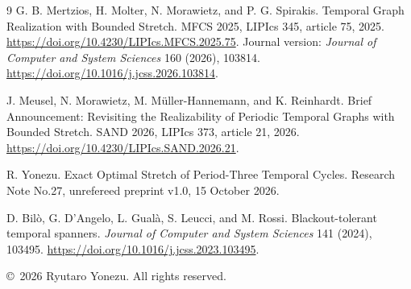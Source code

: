 \documentclass[11pt,a4paper]{article}
\begin{document}
\begin{thebibliography}{9}
G. B. Mertzios, H. Molter, N. Morawietz, and P. G. Spirakis.
\newblock Temporal Graph Realization with Bounded Stretch.
\newblock MFCS 2025, LIPIcs 345, article 75, 2025.
\newblock \url{https://doi.org/10.4230/LIPIcs.MFCS.2025.75}.
\newblock Journal version: \emph{Journal of Computer and System Sciences} 160 (2026), 103814.
\url{https://doi.org/10.1016/j.jcss.2026.103814}.

J. Meusel, N. Morawietz, M. M\"uller-Hannemann, and K. Reinhardt.
\newblock Brief Announcement: Revisiting the Realizability of Periodic Temporal Graphs with Bounded Stretch.
\newblock SAND 2026, LIPIcs 373, article 21, 2026.
\newblock \url{https://doi.org/10.4230/LIPIcs.SAND.2026.21}.

R. Yonezu.
\newblock Exact Optimal Stretch of Period-Three Temporal Cycles.
\newblock Research Note No.27, unrefereed preprint v1.0, 15 October 2026.

D. Bil\`o, G. D'Angelo, L. Gual\`a, S. Leucci, and M. Rossi.
\newblock Blackout-tolerant temporal spanners.
\newblock \emph{Journal of Computer and System Sciences} 141 (2024), 103495.
\newblock \url{https://doi.org/10.1016/j.jcss.2023.103495}.
\end{thebibliography}
\vspace{5pt}
\noindent\footnotesize\copyright\ 2026 Ryutaro Yonezu. All rights reserved.\normalsize
\end{document}
